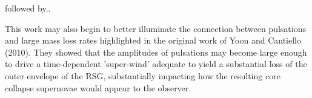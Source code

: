 followed by.. 


 This work may also begin to better illuminate the connection between
 pulsations and large mass loss rates highlighted in the original work
 of Yoon and Cantiello (2010). They showed that the amplitudes of
 pulsations may become large enough to drive a time-dependent
 'super-wind' adequate to yield a substantial loss of the outer
 envelope of the RSG, substantially impacting how the resulting core
 collapse supernovae would appear to the observer. 